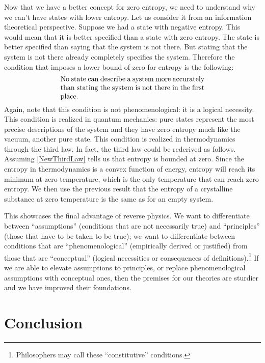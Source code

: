 \documentclass[10pt,twocolumn, nofootinbib]{revtex4-2}
\begin{document}
Now that we have a better concept for zero entropy, we need to understand why we can't have states with lower entropy. Let us consider it from an information theoretical perspective. Suppose we had a state with negative entropy. This would mean that it is better specified than a state with zero entropy. The state is better specified than saying that the system is not there. But stating that the system is not there already completely specifies the system. Therefore the condition that imposes a lower bound of zero for entropy is the following:
\begin{align}\label{NewThirdLaw}
	\parbox{2.8in}{No state can describe a system more accurately than stating the system is not there in the first place.}
\end{align}
Again, note that this condition is not phenomenological: it is a logical necessity. This condition is realized in quantum mechanics: pure states represent the most precise descriptions of the system and they have zero entropy much like the vacuum, another pure state. This condition is realized in thermodynamics through the third law. In fact, the third law could be rederived as follows. Assuming \eqref{NewThirdLaw} tells us that entropy is bounded at zero. Since the entropy in thermodynamics is a convex function of energy, entropy will reach its minimum at zero temperature, which is the only temperature that can reach zero entropy. We then use the previous result that the entropy of a crystalline substance at zero temperature is the same as for an empty system.

This showcases the final advantage of reverse physics. We want to differentiate between ``assumptions'' (conditions that are not necessarily true) and ``principles'' (those that have to be taken to be true); we want to differentiate between conditions that are ``phenomenological'' (empirically derived or justified) from those that are ``conceptual'' (logical necessities or consequences of definitions).\footnote{Philosophers may call these ``constitutive'' conditions.} If we are able to elevate assumptions to principles, or replace phenomenological assumptions with conceptual ones, then the premises for our theories are sturdier and we have improved their foundations.

\section{Conclusion}
\end{document}
